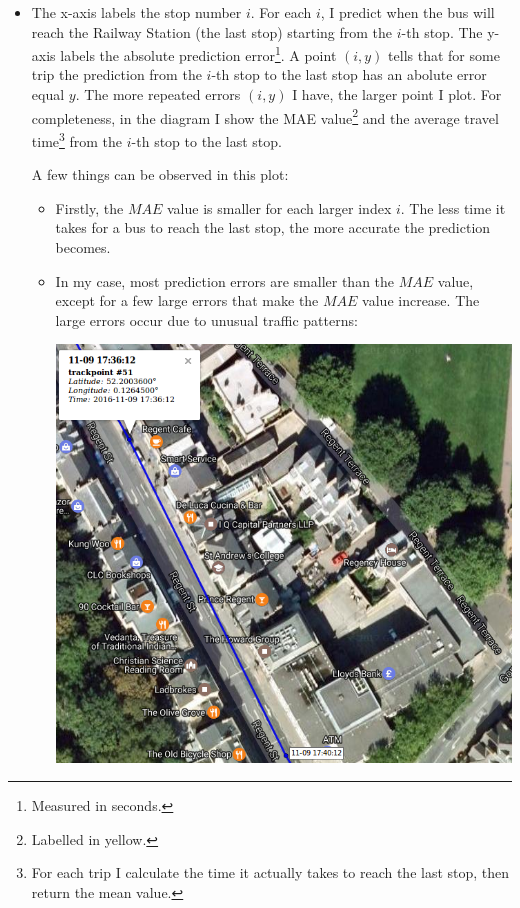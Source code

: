 \documentclass[12pt,a4paper,oneside,openright]{report}
\begin{document}
\begin{itemize}

\item[]
   The x-axis labels the stop number $i$. For each $i$, I predict when the bus
   will reach the Railway Station (the last stop) starting from the $i$-th stop.
   The y-axis labels the absolute prediction error\footnote{Measured in seconds.}.
   A point $(i, y)$ tells that for some trip the prediction from the $i$-th stop
   to the last stop has an abolute error equal $y$. The more repeated errors
   $(i, y)$ I have, the larger point I plot. For completeness,
   in the diagram I show the MAE value\footnote{Labelled in yellow.} and the 
   average travel time\footnote{For each trip I calculate the time it actually
   takes to reach the last stop, then return the mean value.} from the $i$-th stop
   to the last stop.

   A few things can be observed in this plot:
   
\begin{itemize} 
   
   \item 
   Firstly, the $MAE$ value is smaller
   for each larger index $i$. The less time it takes for a bus to reach the last
   stop, the more accurate the prediction becomes.

   \item
   In my case, most prediction errors are smaller than the $MAE$ value,
   except for a few large errors that make the $MAE$ value increase. The large errors
   occur due to unusual traffic patterns:

   \includegraphics[scale=0.6]{figs/unusual_pattern.png} \\


\end{itemize}
\end{itemize}
\end{document}
